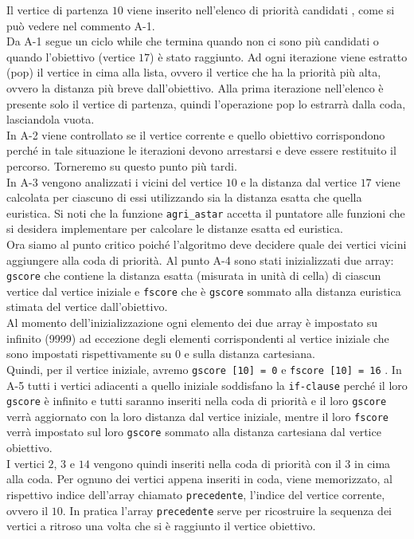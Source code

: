 \documentclass[8pt]{book}
\begin{document}
Il vertice di partenza $10$ viene inserito nell'elenco di priorità candidati , come si può vedere nel commento A-1.\\
Da A-1 segue un ciclo while che termina quando non ci sono più candidati o quando l'obiettivo (vertice $17$) è stato raggiunto. Ad ogni iterazione viene estratto (pop) il vertice in cima alla lista, ovvero il vertice che ha la priorità più alta, ovvero la distanza più breve dall'obiettivo. Alla prima iterazione nell'elenco è presente solo il vertice di partenza, quindi l'operazione pop lo estrarrà dalla coda, lasciandola vuota.\\
In A-2 viene controllato se il vertice corrente e quello obiettivo corrispondono perché in tale situazione le iterazioni devono arrestarsi e deve essere restituito il percorso. Torneremo su questo punto più tardi.\\
In A-3 vengono analizzati i vicini del vertice $10$ e la distanza dal vertice $17$ viene calcolata per ciascuno di essi utilizzando sia la distanza esatta che quella euristica. Si noti che la funzione \texttt{agri\_astar} accetta il puntatore alle funzioni che si desidera implementare per calcolare le distanze esatta ed euristica.\\
Ora siamo al punto critico poiché l'algoritmo deve decidere quale dei vertici vicini aggiungere alla coda di priorità. Al punto A-4 sono stati inizializzati due array: \texttt{gscore} che contiene la distanza esatta (misurata in unità di cella) di ciascun vertice dal vertice iniziale e \texttt{fscore} che è \texttt{gscore} sommato alla distanza euristica stimata del vertice dall'obiettivo.\\
Al momento dell'inizializzazione ogni elemento dei due array è impostato su infinito (9999) ad eccezione degli elementi corrispondenti al vertice iniziale che sono impostati rispettivamente su $0$ e sulla distanza cartesiana.\\
Quindi, per il vertice iniziale, avremo \texttt{gscore {[}10{]} = 0} e \texttt{fscore {[}10{]} = 16} . In A-5 tutti i vertici adiacenti a quello iniziale soddisfano la \texttt{if-clause} perché il loro \texttt{gscore} è infinito e tutti saranno inseriti nella coda di priorità e il loro \texttt{gscore} verrà aggiornato con la loro distanza dal vertice iniziale, mentre il loro \texttt{fscore} verrà impostato sul loro \texttt{gscore} sommato alla distanza cartesiana dal vertice obiettivo.\\
I vertici $2$, $3$ e $14$ vengono quindi inseriti nella coda di priorità con il $3$ in cima alla coda. Per ognuno dei vertici appena inseriti in coda, viene memorizzato, al rispettivo indice dell'array chiamato \texttt{precedente}, l'indice del vertice corrente, ovvero il $10$. In pratica l'array \texttt{precedente} serve per ricostruire la sequenza dei vertici a ritroso una volta che si è raggiunto il vertice obiettivo.\\
\end{document}
